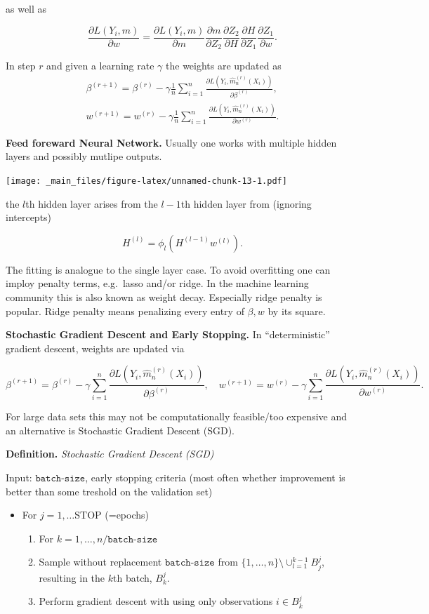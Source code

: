 \documentclass[
]{book}
\providecommand{\tightlist}{%
  \setlength{\itemsep}{0pt}\setlength{\parskip}{0pt}}
\begin{document}
as well as

\[
\frac{\partial L(Y_i,m)}{\partial w}=\frac{\partial L(Y_i,m)}{\partial m}\frac{\partial m}{\partial Z_2} \frac{\partial Z_2}{\partial H} \frac{\partial H}{\partial Z_1}\frac{\partial Z_1}{\partial w}.
\]

In step \(r\) and given a learning rate \(\gamma\) the weights are updated as
\begin{align*}
\beta^{(r+1)}= \beta^{(r)} -\gamma \frac 1 n \sum_{i=1}^n\frac{\partial L(Y_i,\hat m_n^{(r)}(X_i))}{\partial \beta^{(r)}},  \\
w^{(r+1)}= w^{(r)} -\gamma  \frac 1 n \sum_{i=1}^n \frac{\partial L(Y_i,\hat m_n^{(r)}(X_i))}{\partial w^{(r)}}. 
\end{align*}

\textbf{Feed foreward Neural Network.} Usually one works with multiple hidden layers and possibly mutlipe outputs.

\texttt{[image: \_main\_files/figure-latex/unnamed-chunk-13-1.pdf]}

the \(l\)th hidden layer arises from the \(l-1\)th hidden layer from (ignoring intercepts)

\[
H^{(l)}=\phi_l(H^{(l-1)}w^{(l)}).
\]

The fitting is analogue to the single layer case. To avoid overfitting one can imploy penalty terms, e.g.~lasso and/or ridge. In the machine learning community this is also known as weight decay. Especially ridge penalty is popular. Ridge penalty means penalizing every entry of \(\beta, w\) by its square.

\textbf{Stochastic Gradient Descent and Early Stopping.} In ``deterministic'' gradient descent, weights are updated via

\[
\beta^{(r+1)}= \beta^{(r)} -\gamma \sum_{i=1}^n\frac{\partial L(Y_i,\hat m_n^{(r)}(X_i))}{\partial \beta^{(r)}},  \quad
w^{(r+1)}= w^{(r)} -\gamma  \sum_{i=1}^n \frac{\partial L(Y_i,\hat m_n^{(r)}(X_i))}{\partial w^{(r)}}.
\]

For large data sets this may not be computationally feasible/too expensive and an alternative is Stochastic Gradient Descent (SGD).

\textbf{Definition.} \emph{Stochastic Gradient Descent (SGD)}

Input: \(\texttt{batch-size}\), early stopping criteria (most often whether improvement is better than some treshold on the validation set)

\begin{itemize}
\tightlist
\item
  For \(j=1,\dots\)STOP (=epochs)

  \begin{enumerate}
  \def\labelenumi{\arabic{enumi}.}
  \tightlist
  \item
    For \(k=1,\dots, n/\texttt{batch-size}\)
  \item
    Sample without replacement \(\texttt{batch-size}\) from \(\{1,\dots,n\}\setminus \cup_{l=1}^{k-1}B_j^j\), resulting in the \(k\)th batch, \(B_k^j\).
  \item
    Perform gradient descent with using only observations \(i \in B_k^j\)
  \end{enumerate}
\end{itemize}
\end{document}
